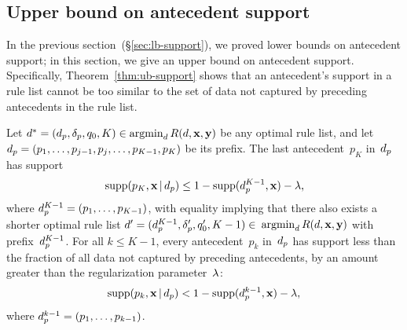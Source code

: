 \begin{arxiv}
\subsection{Upper bound on antecedent support}
\label{sec:ub-support}

In the previous section~(\S\ref{sec:lb-support}), we proved lower bounds
on antecedent support; in this section, we give an upper bound on
antecedent support.
%
Specifically, Theorem~\ref{thm:ub-support} shows that an antecedent's
support in a rule list cannot be too similar to the set of data not
captured by preceding antecedents in the rule list.

\begin{theorem}
\label{thm:ub-support}
Let ${{d}^* = (d_p, \delta_p, q_0, K) \in \operatorname*{argmin}_{d} R({d}, \mathbf{x}, \mathbf{y})}$
be any optimal rule list, and let
${d_p = (p_1, \dots, p_{j-1}, p_j, \dots, p_{K-1}, p_K)}$ be its prefix.
%
The last antecedent~$p_K$ in~$d_p$ has support
\begin{align}
\Supp(p_K, \x \given \Prefix) \le 1 - \Supp(\Prefix^{K-1}, \x) - \Reg,
\label{eq:ub-support-last}
\end{align}
where ${d_p^{K-1} = (p_1, \dots, p_{K-1})}$,
with equality implying that there also exists a shorter optimal rule list
${{d}' = (d_p^{K-1}, \delta_p', q_0', K - 1) \in}$ ${\operatorname*{argmin}_{d} R({d}, \mathbf{x}, \mathbf{y})}$
with prefix~$d_p^{K-1}$.
%
For all ${k \le K - 1}$, every antecedent~$p_k$ in~$d_p$ has support
less than the fraction of all data not captured by preceding antecedents,
by an amount greater than the regularization parameter~${\lambda}$:
\begin{align}
\Supp(p_k, \x \given \Prefix) < 1 - \Supp(\Prefix^{k-1}, \x) - \Reg,
\label{eq:ub-support}
\end{align}
where ${d_p^{k-1} = (p_1, \dots, p_{k-1})}$.
\end{theorem}


\end{arxiv}
